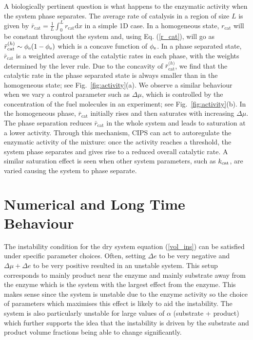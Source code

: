 A biologically pertinent question is what happens to the enzymatic activity when the system phase separates. The average rate of catalysis in a region of size $L$ is given by $\bar{r}_\mathrm{cat} = \frac{1}{L}\int_0^L r_\mathrm{cat} \mathrm{d}x$ in a simple 1D case. In a homogeneous state, $r_\mathrm{cat}$ will be constant throughout the system and, using Eq. (\ref{r_cat}), will go as $\bar{r}_\mathrm{cat}^{\mathrm(h)}\sim\phi_{\mathrm{e}}(1-\phi_{\mathrm{e}})$ which is a concave function of $\phi_{\mathrm{e}}$. In a phase separated state, $\bar{r}_\mathrm{cat}$ is a weighted average of the catalytic rates in each phase, with the weights determined by the lever rule. Due to the concavity of $\bar{r}_\mathrm{cat}^{\mathrm(h)}$, we find that the catalytic rate in the phase separated state is always smaller than in the homogeneous state; see Fig.~\ref{fig:activity}(a). We observe a similar behaviour when we vary a control parameter such as $\Delta\mu$, which is controlled by the concentration of the fuel molecules in an experiment; see Fig.~\ref{fig:activity}(b). In the homogeneous phase, $\bar{r}_\mathrm{cat}$ initially rises and then saturates with increasing $\Delta\mu$. The phase separation reduces $\bar{r}_\mathrm{cat}$ in the whole system and leads to saturation at a lower activity. Through this mechanism, CIPS can act to autoregulate the enzymatic activity of the mixture: once the activity reaches a threshold, the system phase separates and gives rise to a reduced overall catalytic rate. A similar saturation effect is seen when other system parameters, such as $k_{\mathrm{cat}}$, are varied causing the system to phase separate.

\section{Numerical and Long Time Behaviour}
The instability condition for the dry system equation (\ref{vol_ins}) can be satisfied under specific parameter choices. Often, setting $\Delta e$ to be very negative and $\Delta \mu + \Delta e$ to be very positive resulted in an unstable system. This setup corresponds to mainly product near the enzyme and mainly substrate away from the enzyme which is the system with the largest effect from the enzyme. This makes sense since the system is unstable due to the enzyme activity so the choice of parameters which maximises this effect is likely to aid the instability. The system is also particularly unstable for large values of $\alpha$ (substrate + product) which further supports the idea that the instability is driven by the substrate and product volume fractions being able to change significantly.

